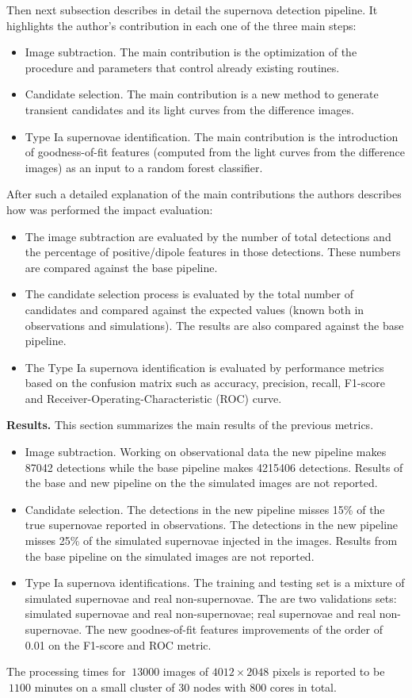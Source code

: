 \documentclass{article}
\begin{document}
Then next subsection describes in detail the supernova detection pipeline. It highlights the author's contribution in each one of the three main steps:
\begin{itemize}
    \item Image subtraction. The main
    contribution is the optimization of the procedure and
    parameters that control already existing routines.
    \item Candidate selection. The main contribution is a new method to generate transient candidates and its light curves from the difference images.
    \item Type Ia supernovae identification. The main 
    contribution is the introduction of goodness-of-fit
    features (computed from the light curves from the difference images) as an input to a random forest
    classifier.
\end{itemize}
After such a detailed explanation of the main contributions the authors describes how was performed the impact evaluation:
\begin{itemize}
    \item The image subtraction are evaluated by the number of total detections and the percentage of positive/dipole features in those detections. These numbers are compared against the base pipeline.
    \item The candidate selection process is evaluated by the total number of candidates and compared against the expected values (known both in observations and simulations). The results are also compared against the base pipeline.
    \item The Type Ia supernova identification is evaluated by performance metrics based on the confusion matrix such as accuracy, precision, recall, F1-score and Receiver-Operating-Characteristic (ROC) curve.
\end{itemize}

{\bf Results.} This section summarizes the main results of the previous metrics.
\begin{itemize}
\item Image subtraction. Working on observational data the new pipeline makes 87042 detections while the base pipeline makes 4215406 detections. Results of the base and new pipeline on the the simulated images are not reported.
\item Candidate selection. The detections in the new pipeline misses 15\% of the true supernovae reported in observations. The detections in the new pipeline misses 25\% of the simulated supernovae injected in the images. Results from the base pipeline on the simulated images are not reported.
\item Type Ia supernova identifications. The training and testing set is a mixture of simulated supernovae and real non-supernovae. The are two validations sets: simulated supernovae and real non-supernovae; real supernovae and real non-supernovae. The new goodnes-of-fit features improvements of the order of 0.01 on the F1-score and ROC metric. 
\end{itemize}
The processing times for $~13000$ images of $4012\times 2048$ pixels is reported to be $~1100$ minutes on a small cluster of 30 nodes with 800 cores in total. 
\end{document}
